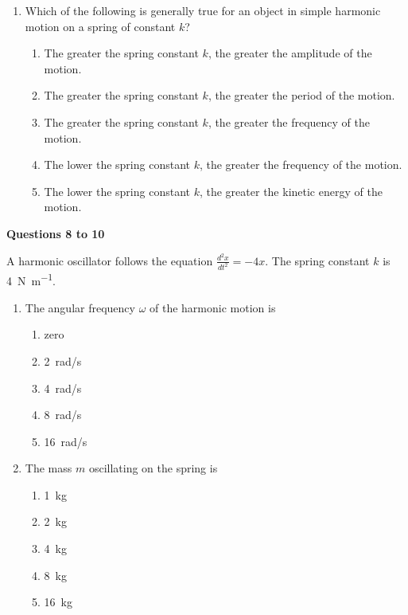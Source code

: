 \documentclass{../../oss-apphys}
\begin{document}
\begin{multicols}{2}
\begin{enumerate}[leftmargin=18pt]
    \columnbreak
    
  \item Which of the following is generally true for an object in simple
    harmonic motion on a spring of constant $k$?
    \begin{enumerate}[noitemsep,topsep=0pt,leftmargin=18pt,label=(\Alph*)]
    \item The greater the spring constant $k$, the greater the amplitude of the
      motion.
    \item The greater the spring constant $k$, the greater the period of the
      motion.
    \item The greater the spring constant $k$, the greater the frequency of the
      motion.
    \item The lower the spring constant $k$, the greater the frequency of the
      motion.
    \item The lower the spring constant $k$, the greater the kinetic energy of
      the motion.
    \end{enumerate}
  \end{enumerate}

  \textbf{Questions 8 to 10}

  A harmonic oscillator follows the equation
  $\displaystyle\frac{d^2x}{dt^2}=-4x$. The spring constant $k$ is
  \SI{4}{\newton\per\metre}.
  
  \begin{enumerate}[leftmargin=18pt,resume]
  \item The angular frequency $\omega$ of the harmonic motion is
    \begin{enumerate}[noitemsep,topsep=0pt,leftmargin=18pt,label=(\Alph*)]
    \item zero
    \item\SI{2}{rad/s}
    \item\SI{4}{rad/s}
    \item\SI{8}{rad/s}
    \item\SI{16}{rad/s}
    \end{enumerate}

  \item The mass $m$ oscillating on the spring is
    \begin{enumerate}[noitemsep,topsep=0pt,leftmargin=18pt,label=(\Alph*)]
    \item\SI{1}{\kilo\gram}
    \item\SI{2}{\kilo\gram}
    \item\SI{4}{\kilo\gram}
    \item\SI{8}{\kilo\gram}
    \item\SI{16}{\kilo\gram}
    \end{enumerate}
  

\end{enumerate}
\end{multicols}
\end{document}
